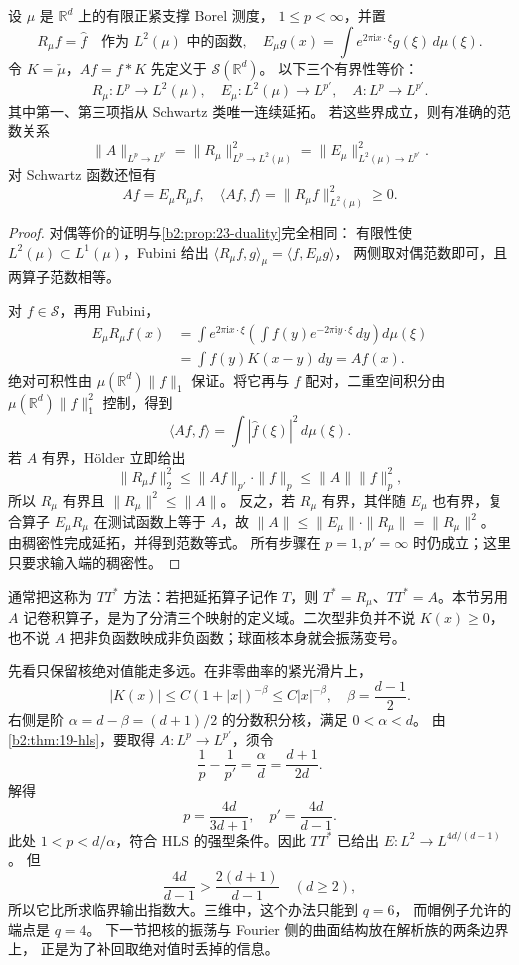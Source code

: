 \begin{proposition}[平方限制与卷积]\label{b2:prop:23-ttstar}
设 \(\mu\) 是 \(\mathbb R^d\) 上的有限正紧支撑 Borel 测度，
\(1\leq p<\infty\)，并置
\[
 R_\mu f=\widehat f\quad\text{作为 }L^2(\mu)\text{ 中的函数},\quad
 E_\mu g(x)=\int e^{2\pi\mathrm i x\cdot\xi}g(\xi)\,d\mu(\xi).
\]
令 \(K=\check\mu\)，\(Af=f*K\) 先定义于 \(\mathcal S(\mathbb R^d)\)。
以下三个有界性等价：
\[
 R_\mu:L^p\to L^2(\mu),\quad
 E_\mu:L^2(\mu)\to L^{p'},\quad
 A:L^p\to L^{p'}.
\]
其中第一、第三项指从 Schwartz 类唯一连续延拓。
若这些界成立，则有准确的范数关系
\[
 \|A\|_{L^p\to L^{p'}}
       =\|R_\mu\|_{L^p\to L^2(\mu)}^2
       =\|E_\mu\|_{L^2(\mu)\to L^{p'}}^2.
\]
对 Schwartz 函数还恒有
\[
 Af=E_\mu R_\mu f,\quad
 \langle Af,f\rangle=\|R_\mu f\|_{L^2(\mu)}^2\geq0.
\]
\end{proposition}
\begin{proof}
对偶等价的证明与\cref{b2:prop:23-duality}完全相同：
有限性使 \(L^2(\mu)\subset L^1(\mu)\)，Fubini 给出
\(\langle R_\mu f,g\rangle_\mu=\langle f,E_\mu g\rangle\)，
两侧取对偶范数即可，且两算子范数相等。

对 \(f\in\mathcal S\)，再用 Fubini，
\[
 \begin{aligned}
 E_\mu R_\mu f(x)
 &=\int e^{2\pi\mathrm i x\cdot\xi}
       \left(\int f(y)e^{-2\pi\mathrm i y\cdot\xi}\,dy\right)d\mu(\xi)\\
 &=\int f(y)K(x-y)\,dy=Af(x).
 \end{aligned}
\]
绝对可积性由 \(\mu(\mathbb R^d)\|f\|_1\) 保证。将它再与 \(f\)
配对，二重空间积分由 \(\mu(\mathbb R^d)\|f\|_1^2\) 控制，得到
\[
 \langle Af,f\rangle
 =\int|\widehat f(\xi)|^2\,d\mu(\xi).
\]
若 \(A\) 有界，Hölder 立即给出
\[
 \|R_\mu f\|_2^2
       \leq\|Af\|_{p'}\cdot\|f\|_p
       \leq\|A\|\|f\|_p^2,
\]
所以 \(R_\mu\) 有界且 \(\|R_\mu\|^2\leq\|A\|\)。
反之，若 \(R_\mu\) 有界，其伴随 \(E_\mu\) 也有界，复合算子
\(E_\mu R_\mu\) 在测试函数上等于 \(A\)，故
\(\|A\|\leq\|E_\mu\|\cdot\|R_\mu\|=\|R_\mu\|^2\)。
由稠密性完成延拓，并得到范数等式。
所有步骤在 \(p=1,p'=\infty\) 时仍成立；这里只要求输入端的稠密性。
\end{proof}

通常把这称为 \(TT^*\) 方法：若把延拓算子记作 \(T\)，则
\(T^*=R_\mu\)、\(TT^*=A\)。本节另用 \(A\) 记卷积算子，是为了分清三个映射的定义域。二次型非负并不说 \(K(x)\geq0\)，也不说 \(A\) 把非负函数映成非负函数；球面核本身就会振荡变号。

\ProseParagraphBreak
先看只保留核绝对值能走多远。在非零曲率的紧光滑片上，
\[
 |K(x)|\leq C(1+|x|)^{-\beta}\leq C|x|^{-\beta},
 \quad \beta=\frac{d-1}{2}.
\]
右侧是阶
\(\alpha=d-\beta=(d+1)/2\) 的分数积分核，满足 \(0<\alpha<d\)。
由\cref{b2:thm:19-hls}，要取得 \(A:L^p\to L^{p'}\)，须令
\[
 \frac1p-\frac1{p'}=\frac{\alpha}{d}
       =\frac{d+1}{2d}.
\]
解得
\[
 p=\frac{4d}{3d+1},\quad p'=\frac{4d}{d-1}.
\]
此处 \(1<p<d/\alpha\)，符合 HLS 的强型条件。因此
\(TT^*\) 已给出 \(E:L^2\to L^{4d/(d-1)}\)。
但
\[
 \frac{4d}{d-1}>
       \frac{2(d+1)}{d-1}\quad(d\geq2),
\]
所以它比所求临界输出指数大。三维中，这个办法只能到 \(q=6\)，
而帽例子允许的端点是 \(q=4\)。
下一节把核的振荡与 Fourier 侧的曲面结构放在解析族的两条边界上，
正是为了补回取绝对值时丢掉的信息。


